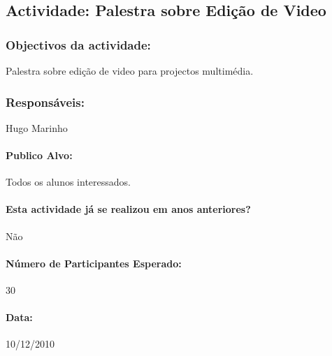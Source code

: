 \subsection{Actividade: Palestra sobre Edição de Video} %

\subsubsection*{Objectivos da actividade:}
Palestra sobre edição de video para projectos multimédia.

\subsubsection*{Responsáveis:}
\begin{itemizedash}
	\item{Hugo Marinho}
\end{itemizedash}

\paragraph{Publico Alvo: }
Todos os alunos interessados.

\paragraph{Esta actividade já se realizou em anos anteriores?}
Não

\paragraph{Número de Participantes Esperado:}
30

\paragraph{Data:} 10/12/2010

\vspace{20pt}
